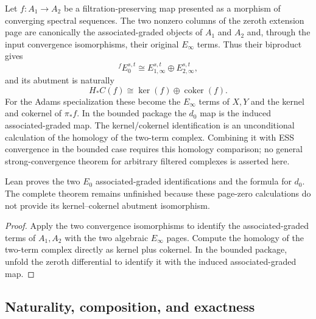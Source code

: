 \begin{theorem}
  \label{thm:fess-e0-abutment-comparison}
  \notready
  Let $f:A_1\to A_2$ be a filtration-preserving map presented as a morphism
  of converging spectral sequences.  The two nonzero columns of the zeroth
  extension page are canonically the associated-graded objects of $A_1$ and
  $A_2$ and, through the input convergence isomorphisms, their original
  $E_\infty$ terms.  Thus their biproduct gives
  \[
    {}^fE_0^{s,t}\cong E_{1,\infty}^{s,t}\oplus E_{2,\infty}^{s,t},
  \]
  and its abutment is naturally
  \[
    H_*C(f)\cong\ker(f)\oplus\operatorname{coker}(f).
  \]
  For the Adams specialization these become the $E_\infty$ terms of $X,Y$
  and the kernel and cokernel of $\pi_*f$.  In the bounded package the $d_0$
  map is the induced associated-graded map.  The kernel/cokernel identification
  is an unconditional calculation of the homology of the two-term complex.
  Combining it with ESS convergence in the bounded case requires this
  homology comparison; no
  general strong-convergence theorem for arbitrary filtered complexes is
  asserted here.

  Lean proves the two $E_0$ associated-graded identifications and the formula
  for $d_0$.  The complete theorem remains unfinished because these page-zero
  calculations do not provide its kernel--cokernel abutment isomorphism.
\end{theorem}

\begin{proof}
  Apply the two convergence isomorphisms to identify the associated-graded
  terms of $A_1,A_2$ with the two algebraic $E_\infty$ pages.  Compute the
  homology of the two-term complex directly as kernel plus cokernel.  In the
  bounded package, unfold the zeroth differential to identify it with the
  induced associated-graded map.
\end{proof}

\subsection{Naturality, composition, and exactness}

